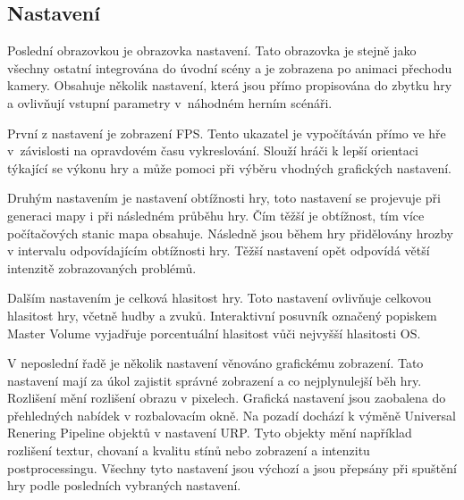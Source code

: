 \subsection{Nastavení}
\label{sec:nastaveni}
Poslední obrazovkou je obrazovka nastavení. Tato obrazovka je stejně jako všechny ostatní integrována do úvodní scény a je zobrazena po animaci přechodu kamery. Obsahuje několik nastavení, která jsou přímo propisována do zbytku hry a ovlivňují vstupní parametry v~náhodném herním scénáři.

První z nastavení je zobrazení FPS. Tento ukazatel je vypočítáván přímo ve hře v~závislosti na opravdovém času vykreslování. Slouží hráči k lepší orientaci týkající se výkonu hry a může pomoci při výběru vhodných grafických nastavení.

Druhým nastavením je nastavení obtížnosti hry, toto nastavení se projevuje při generaci mapy i při následném průběhu hry. Čím těžší je obtížnost, tím více počítačových stanic mapa obsahuje. Následně jsou během hry přidělovány hrozby v intervalu odpovídajícím obtížnosti hry. Těžší nastavení opět odpovídá větší intenzitě zobrazovaných problémů.

Dalším nastavením je celková hlasitost hry. Toto nastavení ovlivňuje celkovou hlasitost hry, včetně hudby a zvuků. Interaktivní posuvník označený popiskem Master Volume vyjadřuje porcentuální hlasitost vůči nejvyšší hlasitosti OS.

V neposlední řadě je několik nastavení věnováno grafickému zobrazení. Tato nastavení mají za úkol zajistit správné zobrazení a co nejplynulejší běh hry. Rozlišení mění rozlišení obrazu v pixelech. Grafická nastavení jsou zaobalena do přehledných nabídek v rozbalovacím okně. Na pozadí dochází k výměně Universal Renering Pipeline objektů v nastavení URP. Tyto objekty mění například rozlišení textur, chovaní a kvalitu stínů nebo zobrazení a intenzitu postprocessingu. Všechny tyto nastavení jsou výchozí a jsou přepsány při spuštění hry podle posledních vybraných nastavení.